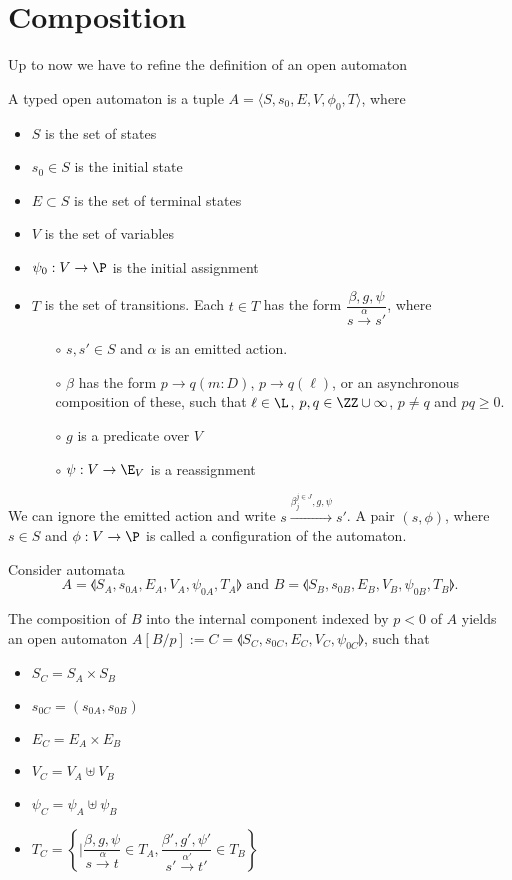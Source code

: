 \section{Composition}

Up to now we have to refine the definition of an open automaton

\begin{definition} A typed open automaton is a tuple $A=\langle S, s_0, E, V, \phi_0, T\rangle$, where
  \begin{itemize}
    \item $S$ is the set of states
    \item $s_0\in S$ is the initial state
    \item $E\subset S$ is the set of terminal states
    \item $V$ is the set of variables
    \item $\psi_0: V\to\P$ is the initial assignment
    \item $T$ is the set of transitions. Each $t\in T$ has the form $\dfrac{\beta, g, \psi}{s\xrightarrow{\alpha}s'}$, where
          \begin{itemize}
            \item [$\circ$]$s,s'\in S$ and $\alpha$ is an emitted action.
            \item [$\circ$] $\beta$ has the form $p\to q(m : D)$, $p\to q(\ell)$, or an asynchronous composition of these, such that $\ell\in\L$, $p,q\in \ZZ\cup\infty$, $p\neq q$ and $pq\ge0$.
            \item [$\circ$] $g$ is a predicate over $V$
            \item [$\circ$] $\psi: V\to \E_V$ is a reassignment
          \end{itemize}
  \end{itemize}
  We can ignore the emitted action and write $s\xrightarrow{\beta_{j}^{j\in J}, g, \psi}s'$. A pair $(s, \phi)$, where $s\in S$ and $\phi:V\to\P$ is called a configuration of the automaton.
\end{definition}

\begin{definition}
  Consider automata
  $$A=\llangle S_A, s_{0A}, E_A, V_A, \psi_{0A}, T_A\rrangle \text{ and } B=\llangle S_B, s_{0B}, E_B, V_B, \psi_{0B}, T_B\rrangle.$$

  The composition of $B$ into the internal component indexed by $p<0$ of $A$ yields an open automaton $A[B/p]:=C=\llangle S_C, s_{0C}, E_C, V_C, \psi_{0C}\rrangle$, such that
  \begin{itemize}
    \item $S_C = S_A\times S_B$
    \item $s_{0C} = (s_{0A}, s_{0B})$
    \item $E_C = E_A\times E_B$
    \item $V_C = V_A\uplus V_B$
    \item $\psi_C = \psi_A\uplus \psi_B$
    \item $T_C = \left\{\Bigg|\dfrac{\beta, g, \psi}{s\xrightarrow{\alpha} t}\in T_A, \dfrac{\beta', g', \psi'}{s'\xrightarrow{\alpha'} t'}\in T_B\right\}$
  \end{itemize}
\end{definition}